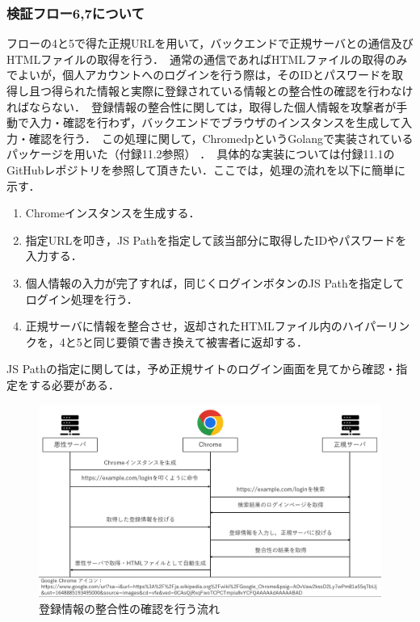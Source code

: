 \documentclass[dvipdfmx]{jsarticle}
\begin{document}
            \subsubsection{検証フロー6,7について}
                フローの4と5で得た正規URLを用いて，バックエンドで正規サーバとの通信及びHTMLファイルの取得を行う．\
                通常の通信であればHTMLファイルの取得のみでよいが，個人アカウントへのログインを行う際は，そのIDとパスワードを取得し且つ得られた情報と実際に登録されている情報との整合性の確認を行わなければならない．\
                登録情報の整合性に関しては，取得した個人情報を攻撃者が手動で入力・確認を行わず，バックエンドでブラウザのインスタンスを生成して入力・確認を行う．\
                この処理に関して，ChromedpというGolangで実装されているパッケージを用いた（付録11.2参照） ．\
                具体的な実装については付録11.1のGitHubレポジトリを参照して頂きたい．ここでは，処理の流れを以下に簡単に示す．\
                \begin{enumerate}
                    \item Chromeインスタンスを生成する．
                    \item 指定URLを叩き，JS Pathを指定して該当部分に取得したIDやパスワードを入力する．
                    \item 個人情報の入力が完了すれば，同じくログインボタンのJS Pathを指定してログイン処理を行う．
                    \item 正規サーバに情報を整合させ，返却されたHTMLファイル内のハイパーリンクを，4と5と同じ要領で書き換えて被害者に返却する．
                \end{enumerate}
                JS Pathの指定に関しては，予め正規サイトのログイン画面を見てから確認・指定をする必要がある．\
                \begin{figure}[pth]
                    \centering
                    \includegraphics[width=12cm]{img/vc-vf-6-7.png}
                    \caption{登録情報の整合性の確認を行う流れ}
                    \label{flow-6-7}
                \end{figure}
                \clearpage
\end{document}
